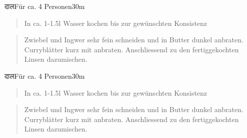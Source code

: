 \documentclass[
  a4paper,
]{article}
\begin{document}
\begin{recipe}{दाल}{Für ca. 4 Personen}{30m}


\begin{quote}
In ca. 1-1.5l Wasser kochen bis zur gewünschten Konsistenz
\end{quote}

\freeform\hrulefill


\begin{quote}
Zwiebel und Ingwer sehr fein schneiden und in Butter dunkel anbraten.
Curryblätter kurz mit anbraten. Anschliessend zu den fertiggekochten
Linsen dazumischen.
\end{quote}

\freeform\hrulefill\newline{}\end{recipe}

\newpage

\begin{recipe}{दाल}{Für ca. 4 Personen}{30m}


\begin{quote}
In ca. 1-1.5l Wasser kochen bis zur gewünschten Konsistenz
\end{quote}

\freeform\hrulefill


\begin{quote}
Zwiebel und Ingwer sehr fein schneiden und in Butter dunkel anbraten.
Curryblätter kurz mit anbraten. Anschliessend zu den fertiggekochten
Linsen dazumischen.
\end{quote}

\freeform\hrulefill\newline{}\end{recipe}
\end{document}
